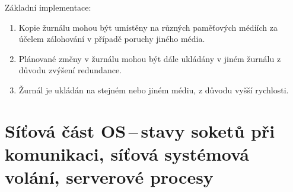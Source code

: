 Základní implementace:

\begin{enumerate}
    \item Kopie žurnálu mohou být umístěny na různých paměťových médiích za účelem zálohování v případě poruchy jiného média.
    \item Plánované změny v žurnálu mohou být dále ukládány v jiném žurnálu z důvodu zvýšení redundance.
    \item Žurnál je ukládán na stejném nebo jiném médiu, z důvodu vyšší rychlosti. 
\end{enumerate}

\newpage
\section{Síťová část OS\,--\,stavy soketů při komunikaci, síťová systémová volání, serverové procesy}